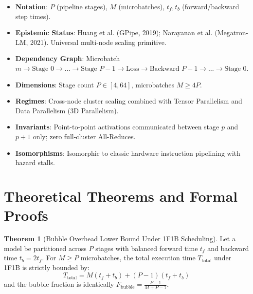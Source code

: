 \documentclass[11pt,a4paper]{article}
\theoremstyle{definition}
\newtheorem{theorem}{\textbf{Theorem}}[section]
\begin{document}
\begin{itemize}
    \item \textbf{Notation}: $P$ (pipeline stages), $M$ (microbatches), $t_f, t_b$ (forward/backward step times).
    \item \textbf{Epistemic Status}: Huang et al. (GPipe, 2019); Narayanan et al. (Megatron-LM, 2021). Universal multi-node scaling primitive.
    \item \textbf{Dependency Graph}: Microbatch $m \to \text{Stage } 0 \to \dots \to \text{Stage } P-1 \to \text{Loss} \to \text{Backward } P-1 \to \dots \to \text{Stage } 0$.
    \item \textbf{Dimensions}: Stage count $P \in [4, 64]$, microbatches $M \ge 4P$.
    \item \textbf{Regimes}: Cross-node cluster scaling combined with Tensor Parallelism and Data Parallelism (3D Parallelism).
    \item \textbf{Invariants}: Point-to-point activations communicated between stage $p$ and $p+1$ only; zero full-cluster All-Reduces.
    \item \textbf{Isomorphisms}: Isomorphic to classic hardware instruction pipelining with hazard stalls.
\end{itemize}

\section{Theoretical Theorems and Formal Proofs}

\begin{theorem}[Bubble Overhead Lower Bound Under 1F1B Scheduling]
Let a model be partitioned across $P$ stages with balanced forward time $t_f$ and backward time $t_b = 2 t_f$. For $M \ge P$ microbatches, the total execution time $T_{\text{total}}$ under 1F1B is strictly bounded by:
{\boldmath
\begin{equation}
T_{\text{total}} = M(t_f + t_b) + (P - 1)(t_f + t_b)
\end{equation}
}
and the bubble fraction is identically $F_{\text{bubble}} = \frac{P - 1}{M + P - 1}$.
\end{theorem}
\end{document}
